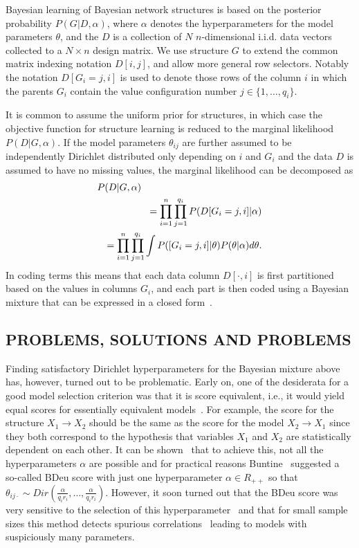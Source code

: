 Bayesian learning of Bayesian network structures is based on the
posterior probability $P(G|D,\alpha)$, where $\alpha$ denotes the
hyperparameters for the model parameters $\theta$, and
the $D$ is a collection of $N$ $n$\nobreakdash-dimensional i.i.d. data
vectors collected to a $N\times n$ design matrix.  We use structure
$G$ to extend the common matrix indexing notation $D[i,j]$, and allow
more general row selectors.  Notably the notation $D[G_i=j,i]$ is used
to denote those rows of the column $i$ in which the parents $G_i$
contain the value configuration number $j\in\{1,\ldots,q_i\}$.

It is common to assume the uniform prior for structures, in which case
the objective function for structure learning is reduced to the
marginal likelihood $P(D|G,\alpha)$.  If the model parameters
$\theta_{ij}$ are further assumed to be independently Dirichlet
distributed only depending on $i$ and $G_{i}$ and the data $D$ is
assumed to have no missing values, the marginal likelihood can be
decomposed as
\begin{eqnarray}
\label{eqn:bayesmix}
\lefteqn{P(D|G,\alpha)}\nonumber\\
&&=\prod_{i=1}^{n}\prod_{j=1}^{q_i}P(D[G_i=j,i]|\alpha)\nonumber\\
&&=\prod_{i=1}^{n}\prod_{j=1}^{q_i}\int P([G_i=j,i]|\theta)P(\theta|\alpha) d\theta.
\end{eqnarray}
In coding terms this means that each data column $D[\cdot,i]$ is first partitioned based on the
values in columns $G_i$, and each part is then coded using a Bayesian mixture that can be expressed
in a closed form~\cite{Bunt91, Heck95}.

\subsection {PROBLEMS, SOLUTIONS AND PROBLEMS}

Finding satisfactory Dirichlet hyperparameters for the Bayesian
mixture above has, however, turned out to be problematic. Early on,
one of the desiderata for a good model selection criterion was that it
is score equivalent, i.e., it would yield equal scores for
essentially equivalent models~\cite{Verm90}.  For example, the score
for the structure $X_1\rightarrow X_2$ should be the same as the score
for the model $X_2 \rightarrow X_1$ since they both correspond to the
hypothesis that variables $X_1$ and $X_2$ are statistically dependent
on each other.  It can be shown~\cite{Heck95} that to achieve this,
not all the hyperparameters $\alpha$ are possible and for practical
reasons Buntine~\cite{Bunt91} suggested a so-called BDeu score with
just one hyperparameter $\alpha\in R_{++}$ so that
$\theta_{ij\cdot}\sim Dir(\frac{\alpha}{q_i
  r_i},\ldots,\frac{\alpha}{q_i r_i})$.  However, it soon turned out
that the BDeu score was very sensitive to the selection of this
hyperparameter~\cite{cosco.uai07} and that for small sample sizes this
method detects spurious correlations~\cite{Steck08} leading to models
with suspiciously many parameters.

